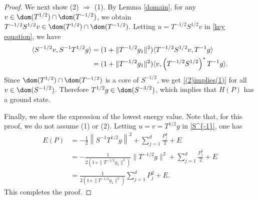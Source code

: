 \documentclass[12pt,draft]{article}
\theoremstyle{plain}
\numberwithin{equation}{section}
\theoremstyle{remark}
\begin{document}
\begin{proof}
We next show (2) $\Rightarrow$ (1).
By Lemma \ref{domain}, for any $v\in\dom(T^{1/2})\cap\dom(T^{-1/2})$, we obtain $T^{-1/2}S^{1/2}v\in\dom(T^{1/2})\cap\dom(T^{-1/2})$.
Letting $u=T^{-1/2}S^{1/2}v$ in \eqref{key equation}, we have
\begin{align}\label{(2)implies(1)}
\langle S^{-1/2}v,S^{-1}T^{1/2}g\rangle 
&= (1+\|T^{-1/2}g_1\|^2)\langle T^{-1/2}S^{1/2}v,T^{-1}g\rangle\notag\\ 
&= (1+\|T^{-1/2}g_1\|^2)\langle v,\left(T^{-1/2}S^{1/2}\right)^*T^{-1}g\rangle.
\end{align}
Since $\dom(T^{1/2})\cap\dom(T^{-1/2})$ is a core of $S^{-1/2}$, we get \eqref{(2)implies(1)} for all $v\in\dom(S^{-1/2})$.
Therefore $T^{1/2}g\in\dom(S^{-3/2})$, which implies that $H(P)$ has a ground state.

Finally, we show the expression of the lowest energy value.
Note that, for this proof, we do not assume (1) or (2).
Letting $u=v=T^{1/2}g$ in \eqref{S^{-1}}, one has
\begin{align*}
E(P) &= -\frac{1}{2}\left\|S^{-1}T^{1/2}g\right\|^2+\sum_{j=1}^d\frac{P_j^2}{2}+ E\\
&= -\frac{1}{2(1+\|T^{-1/2}g_1\|^2)}\|T^{-1/2}g\|^2+\sum_{j=1}^d\frac{P_j^2}{2}+ E\\
&= \frac{1}{2(1+\|T^{-1/2}g_1\|^2)}\sum_{j=1}^d P_j^2+ E.
\end{align*}
This completes the proof.
\end{proof}





\appendix

\end{document}
